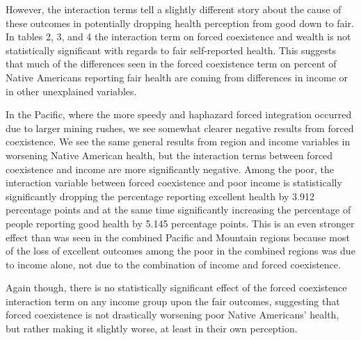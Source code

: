 \documentclass[12pt]{article}
\begin{document}
However, the interaction terms tell a slightly different story about the cause of these outcomes in potentially dropping health perception from good down to fair.  In tables 2, 3, and 4 the interaction term on forced coexistence and wealth is not statistically significant with regards to fair self-reported health.  This suggests that much of the differences seen in the forced coexistence term on percent of Native Americans reporting fair health are coming from differences in income or in other unexplained variables.  

In the Pacific, where the more speedy and haphazard forced integration occurred due to larger mining rushes, we see somewhat clearer negative results from forced coexistence.  We see the same general results from region and income variables in worsening Native American health, but the interaction terms between forced coexistence and income are more significantly negative.  Among the poor, the interaction variable between forced coexistence and poor income is statistically significantly dropping the percentage reporting excellent health by 3.912 percentage points and at the same time significantly increasing the percentage of people reporting good health by 5.145 percentage points.  This is an even stronger effect than was seen in the combined Pacific and Mountain regions because most of the loss of excellent outcomes among the poor in the combined regions was due to income alone, not due to the combination of income and forced coexistence.

Again though, there is no statistically significant effect of the forced coexistence interaction term on any income group upon the fair outcomes, suggesting that forced coexistence is not drastically worsening poor Native Americans’ health, but rather making it slightly worse, at least in their own perception. 
\end{document}
